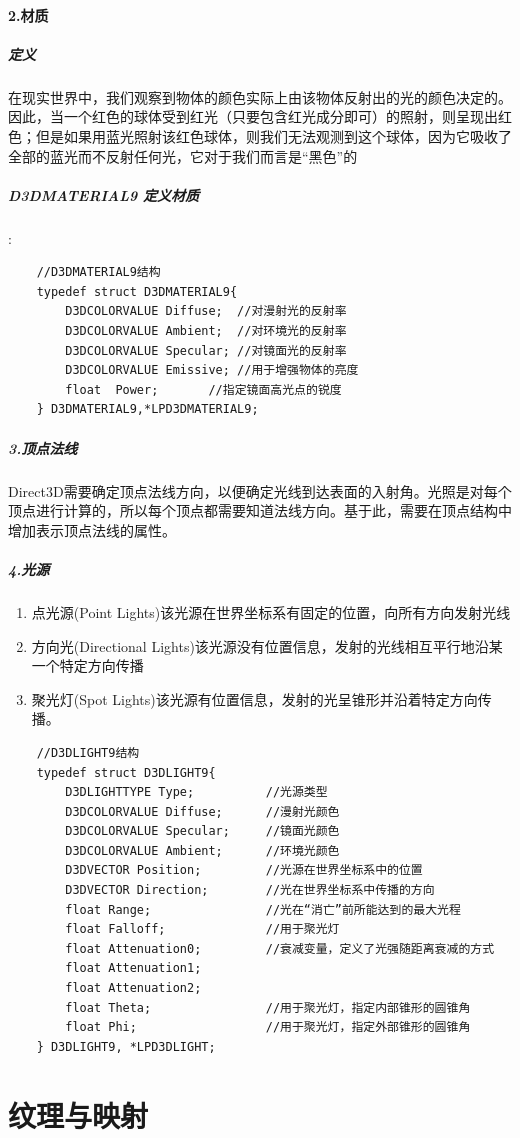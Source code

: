 \documentclass[UTF8,a4paper,8pt]{ctexart}
\begin{document}
	\paragraph{2.材质}
		\subparagraph{定义}
			 在现实世界中，我们观察到物体的颜色实际上由该物体反射出的光的颜色决定的。因此，当一个红色的球体受到红光（只要包含红光成分即可）的照射，则呈现出红色；但是如果用蓝光照射该红色球体，则我们无法观测到这个球体，因为它吸收了全部的蓝光而不反射任何光，它对于我们而言是“黑色”的
		\subparagraph{D3DMATERIAL9 定义材质}:
			\begin{lstlisting}
	//D3DMATERIAL9结构  
	typedef struct D3DMATERIAL9{  
		D3DCOLORVALUE Diffuse;  //对漫射光的反射率  
		D3DCOLORVALUE Ambient;  //对环境光的反射率  
		D3DCOLORVALUE Specular; //对镜面光的反射率  
		D3DCOLORVALUE Emissive; //用于增强物体的亮度  
		float  Power;       //指定镜面高光点的锐度  
	} D3DMATERIAL9,*LPD3DMATERIAL9;  			
			\end{lstlisting}
		\subparagraph{3.顶点法线}
			  Direct3D需要确定顶点法线方向，以便确定光线到达表面的入射角。光照是对每个顶点进行计算的，所以每个顶点都需要知道法线方向。基于此，需要在顶点结构中增加表示顶点法线的属性。
		\subparagraph{4.光源}
			\begin{enumerate}[fullwidth, itemindent = 3em]
				\item 点光源(Point Lights)该光源在世界坐标系有固定的位置，向所有方向发射光线
				\item 方向光(Directional Lights)该光源没有位置信息，发射的光线相互平行地沿某一个特定方向传播
				\item 聚光灯(Spot Lights)该光源有位置信息，发射的光呈锥形并沿着特定方向传播。
			\end{enumerate}
			
				\begin{lstlisting}
	//D3DLIGHT9结构  
	typedef struct D3DLIGHT9{  
		D3DLIGHTTYPE Type;      	//光源类型  
		D3DCOLORVALUE Diffuse;      //漫射光颜色  
		D3DCOLORVALUE Specular;     //镜面光颜色  
		D3DCOLORVALUE Ambient;      //环境光颜色  
		D3DVECTOR Position; 		//光源在世界坐标系中的位置  
		D3DVECTOR Direction;		//光在世界坐标系中传播的方向  
		float Range;        		//光在“消亡”前所能达到的最大光程  
		float Falloff;     			//用于聚光灯  
		float Attenuation0; 		//衰减变量，定义了光强随距离衰减的方式  
		float Attenuation1;  
		float Attenuation2;  
		float Theta;        		//用于聚光灯，指定内部锥形的圆锥角  
		float Phi;      			//用于聚光灯，指定外部锥形的圆锥角  
	} D3DLIGHT9, *LPD3DLIGHT;			  
				\end{lstlisting}
\newpage
\section{纹理与映射}
\end{document}
